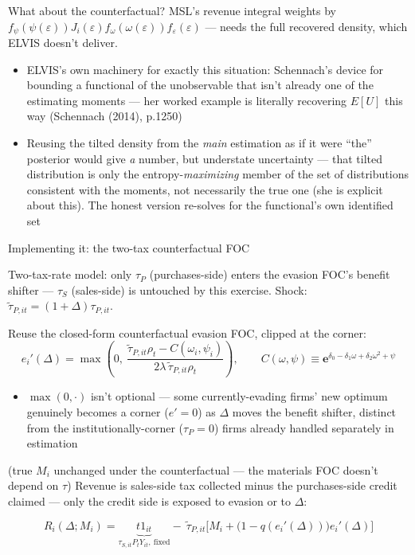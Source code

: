 \documentclass[
  ignorenonframetext,
  aspectratio=169,
]{beamer}
\providecommand{\tightlist}{%
  \setlength{\itemsep}{0pt}\setlength{\parskip}{0pt}}
\begin{document}
\begin{frame}{What about the counterfactual?}
\protect{}\label{what-about-the-counterfactual}
MSL's revenue integral weights by
\(f_\psi(\psi(\varepsilon))J_i(\varepsilon)f_\omega(\omega(\varepsilon))f_\varepsilon(\varepsilon)\)
--- needs the full recovered density, which ELVIS doesn't deliver.

\begin{itemize}
\tightlist
\item
  ELVIS's own machinery for exactly this situation: Schennach's device
  for bounding a functional of the unobservable that isn't already one
  of the estimating moments --- her worked example is literally
  recovering \(E[U]\) this way (Schennach (2014), p.1250)
\item
  Reusing the tilted density from the \emph{main} estimation as if it
  were ``the'' posterior would give \emph{a} number, but understate
  uncertainty --- that tilted distribution is only the
  entropy-\emph{maximizing} member of the set of distributions
  consistent with the moments, not necessarily the true one (she is
  explicit about this). The honest version re-solves for the
  functional's own identified set
\end{itemize}
\end{frame}

\begin{frame}{Implementing it: the two-tax counterfactual FOC}
\protect{}\label{sec-implementing-elvis}
\footnotesize

Two-tax-rate model: only \(\tau_P\) (purchases-side) enters the evasion
FOC's benefit shifter --- \(\tau_S\) (sales-side) is untouched by this
exercise. Shock: \(\tilde\tau_{P,it}=(1+\Delta)\tau_{P,it}\).

Reuse the closed-form counterfactual evasion FOC, clipped at the corner:
\[
e_i'(\Delta)=\max\left(0,\ \frac{\tilde\tau_{P,it}\rho_t-C(\omega_i,\psi_i)}{2\lambda\,\tilde\tau_{P,it}\rho_t}\right),\qquad C(\omega,\psi)\equiv\textbf{e}^{\delta_0-\delta_1\omega+\delta_2\omega^2+\psi}
\]

\begin{itemize}
\tightlist
\item
  \(\max(0,\cdot)\) isn't optional --- some currently-evading firms' new
  optimum genuinely becomes a corner (\(e'=0\)) as \(\Delta\) moves the
  benefit shifter, distinct from the institutionally-corner
  (\(\tau_P=0\)) firms already handled separately in estimation
\end{itemize}

(true \(M_i\) unchanged under the counterfactual --- the materials FOC
doesn't depend on \(\tau\)) Revenue is sales-side tax collected minus
the purchases-side credit claimed --- only the credit side is exposed to
evasion or to \(\Delta\):

\[
R_i(\Delta;M_i)=\underbrace{t1_{it}}_{\tau_{S,it}P_tY_{it},\ \text{fixed}}-\ \tilde\tau_{P,it}\Big[M_i+\big(1-q(e_i'(\Delta))\big)e_i'(\Delta)\Big]
\]
\end{frame}
\end{document}
